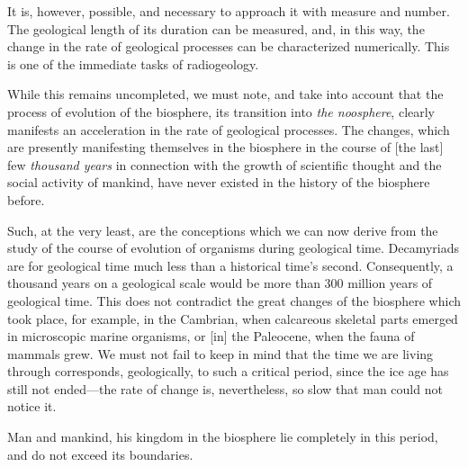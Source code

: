 It is, however, possible, and necessary to approach it with measure and number.
The geological length of its duration can be measured, and, in this way, the
change in the rate of geological processes can be characterized numerically.
This is one of the immediate tasks of radiogeology.


\Section %
While this remains uncompleted, we must note, and take into account that the
process of evolution of the biosphere, its transition into \emph{the
noosphere}, clearly manifests an acceleration in the rate of geological
processes.  The changes, which are presently manifesting themselves in the
biosphere in the course of [the last] few \emph{thousand years} in connection
with the growth of scientific thought and the social activity of mankind, have
never existed in the history of the biosphere before.

Such, at the very least, are the conceptions which we can now derive from the
study of the course of evolution of organisms during geological time.
Decamyriads are for geological time much less than a
historical time's second.  Consequently, a thousand years on a geological scale
would be more than 300 million years of geological time.  This does not
contradict the great changes of the biosphere which took place, for example, in
the Cambrian, when calcareous skeletal parts emerged in microscopic marine
organisms, or [in] the Paleocene, when the fauna of mammals grew.  We must not fail to keep in mind that the time we are living through
corresponds, geologically, to such a critical period, since the ice age has
still not ended---the rate of change is, nevertheless, so slow that man could
not notice it.

Man and mankind, his kingdom in the biosphere lie completely in this period,
and do not exceed its boundaries.

